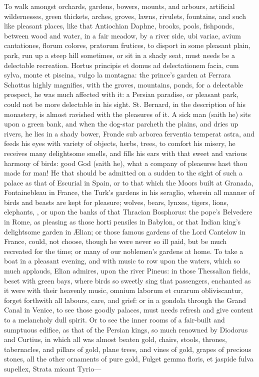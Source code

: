 {To walk amongst orchards, gardens, bowers, mounts, and arbours,
artificial wildernesses, green thickets, arches, groves, lawns,
rivulets, fountains, and such like pleasant places, like that
Antiochian Daphne, brooks, pools, fishponds, between wood and water, in
a fair meadow, by a river side, ubi variae, avium cantationes,
florum colores, pratorum frutices, \etc{} to disport in some pleasant
plain, park, run up a steep hill sometimes, or sit in a shady seat,
must needs be a delectable recreation. Hortus principis et domus ad
delectationem facia, cum sylva, monte et piscina, vulgo la montagna:
the prince's garden at Ferrara Schottus highly magnifies, with
the groves, mountains, ponds, for a delectable prospect, he was much
affected with it: a Persian paradise, or pleasant park, could not be
more delectable in his sight. St. Bernard, in the description of his
monastery, is almost ravished with the pleasures of it. A sick
man (saith he) sits upon a green bank, and when the dog-star
parcheth the plains, and dries up rivers, he lies in a shady bower,
Fronde sub arborea ferventia temperat astra, and feeds his eyes with
variety of objects, herbs, trees, to comfort his misery, he receives
many delightsome smells, and fills his ears with that sweet and various
harmony of birds: good God (saith he), what a company of pleasures hast
thou made for man! He that should be admitted on a sudden to the sight
of such a palace as that of Escurial in Spain, or to that which the
Moors built at Granada, Fontainebleau in France, the Turk's gardens in
his seraglio, wherein all manner of birds and beasts are kept for
pleasure; wolves, bears, lynxes, tigers, lions, elephants, \etc{}, or upon
the banks of that Thracian Bosphorus: the pope's Belvedere in Rome,
as pleasing as those horti pensiles in Babylon, or that Indian
king's delightsome garden in \AE{}lian; or those famous
gardens of the Lord Cantelow in France, could, not choose, though he
were never so ill paid, but be much recreated for the time; or many of
our noblemen's gardens at home. To take a boat in a pleasant evening,
and with music to row upon the waters, which \Plutarch so much
applauds, Elian admires, upon the river Pineus: in those Thessalian
fields, beset with green bays, where birds so sweetly sing that
passengers, enchanted as it were with their heavenly music, omnium
laborum et curarum obliviscantur, forget forthwith all labours, care,
and grief: or in a gondola through the Grand Canal in Venice, to see
those goodly palaces, must needs refresh and give content to a
melancholy dull spirit. Or to see the inner rooms of a fair-built and
sumptuous edifice, as that of the Persian kings, so much renowned by
Diodorus and Curtius, in which all was almost beaten gold,
chairs, stools, thrones, tabernacles, and pillars of gold, plane
trees, and vines of gold, grapes of precious stones, all the other
ornaments of pure gold,
Fulget gemma floris, et jaspide fulva supellex,
Strata micant Tyrio---

}
